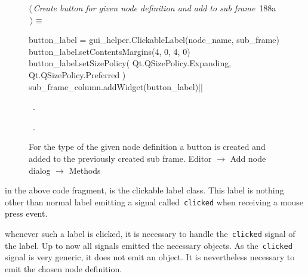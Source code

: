 \documentclass[%
    a4paper,    %
    justified,  %
    nobib,      %
    openany     %
]{tufte-book}
\makeatletter
\renewcommand{\label}[1]{\@tufte@label{##1}}%
\makeatother
\begin{document}
\begin{figure}[!htbp]
\begin{flushleft} \small
\begin{minipage}{\linewidth}\label{scrap167}\raggedright\small
{} $\langle\,${\itshape Create button for given node definition and add to sub frame}\nobreak\ {\footnotesize {188a}}$\,\rangle\equiv$
\vspace{-1ex}
\begin{pythoncode}
    button_label = gui_helper.ClickableLabel(node_name, sub_frame)
    button_label.setContentsMargins(4, 0, 4, 0)
    button_label.setSizePolicy(
        Qt.QSizePolicy.Expanding, Qt.QSizePolicy.Preferred
    )
    sub_frame_column.addWidget(button_label)|\NWsep|
\end{pythoncode}
\vspace{1.5ex}
\footnotesize
\begin{list}{}{\setlength{\itemsep}{-\parsep}\setlength{\itemindent}{-\leftmargin}}
\item \NWtxtMacroDefBy\ .
\item \NWtxtMacroRefIn\ .

\item{}
\end{list}
\end{minipage}\vspace{4ex}
\end{flushleft}
\caption{For the type of the given node definition a button is created and added
  to the previously created sub frame.
  \newline{}\newline{}Editor $\rightarrow$ Add node dialog $\rightarrow$ Methods}
\end{figure}

 in the above code fragment, is the
clickable label class. This label is nothing other than normal label emitting a
signal called~\verb=clicked= when receiving a mouse press event.

 whenever such a label is clicked, it is
necessary to handle the~\verb=clicked= signal of the label. Up to now all
signals emitted the necessary objects. As the~\verb=clicked= signal is very
generic, it does not emit an object. It is nevertheless necessary to emit the
chosen node definition.
\end{document}
